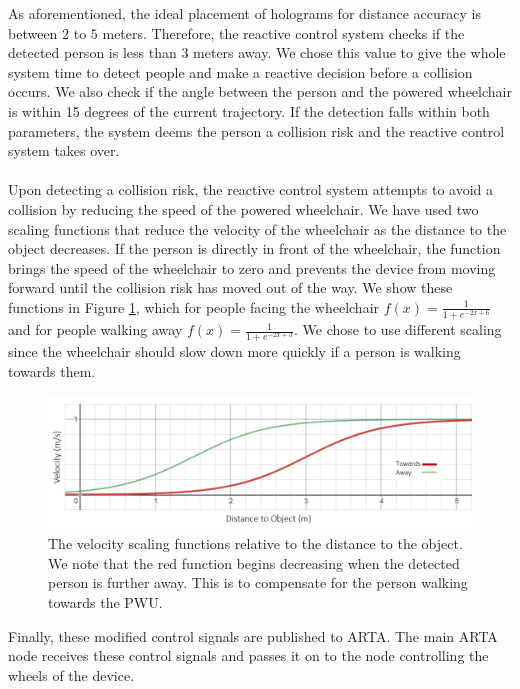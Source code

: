 As aforementioned, the ideal placement of holograms for distance accuracy is between $2$ to $5$ meters. Therefore, the reactive control system checks if the detected person is less than $3$ meters away. We chose this value to give the whole system time to detect people and make a reactive decision before a collision occurs. We also check if the angle between the person and the powered wheelchair is within 15 degrees of the current trajectory. If the detection falls within both parameters, the system deems the person a collision risk and the reactive control system takes over.

\paragraph{} Upon detecting a collision risk, the reactive control system attempts to avoid a collision by reducing the speed of the powered wheelchair. We have used two scaling functions that reduce the velocity of the wheelchair as the distance to the object decreases. If the person is directly in front of the wheelchair, the function brings the speed of the wheelchair to zero and prevents the device from moving forward until the collision risk has moved out of the way. We show these functions in Figure \ref{fig:distanceScalingFunctions}, which for people facing the wheelchair $f(x)=\frac{1}{1 + e^{-2x+6}}$ and for people walking away $f(x)=\frac{1}{1 + e^{-2x+3}}$. We chose to use different scaling since the wheelchair should slow down more quickly if a person is walking towards them.

\begin{figure}[ht]
	\centering
	\includegraphics[width=0.8\linewidth]{img/chapter5_implementation/distanceScaling.PNG}
	\caption{The velocity scaling functions relative to the distance to the object. We note that the red function begins decreasing when the detected person is further away. This is to compensate for the person walking towards the PWU.}
	\label{fig:distanceScalingFunctions}
\end{figure} 

Finally, these modified control signals are published to ARTA. The main ARTA node receives these control signals and passes it on to the node controlling the wheels of the device.

